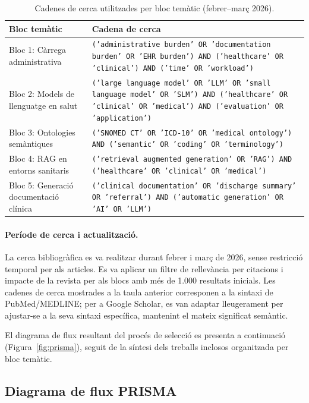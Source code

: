 \documentclass[CAT]{TFUOC}%
\begin{document}
\begin{table}[H]
\centering
\small
\begin{tabular}{p{3.5cm}p{10cm}}
\hline
\textbf{Bloc temàtic} & \textbf{Cadena de cerca} \\
\hline
Bloc 1: Càrrega administrativa & \texttt{('administrative burden' OR 'documentation burden' OR 'EHR burden') AND ('healthcare' OR 'clinical') AND ('time' OR 'workload')} \\
\hline
Bloc 2: Models de llenguatge en salut & \texttt{('large language model' OR 'LLM' OR 'small language model' OR 'SLM') AND ('healthcare' OR 'clinical' OR 'medical') AND ('evaluation' OR 'application')} \\
\hline
Bloc 3: Ontologies semàntiques & \texttt{('SNOMED CT' OR 'ICD-10' OR 'medical ontology') AND ('semantic' OR 'coding' OR 'terminology')} \\
\hline
Bloc 4: RAG en entorns sanitaris & \texttt{('retrieval augmented generation' OR 'RAG') AND ('healthcare' OR 'clinical' OR 'medical')} \\
\hline
Bloc 5: Generació documentació clínica & \texttt{('clinical documentation' OR 'discharge summary' OR 'referral') AND ('automatic generation' OR 'AI' OR 'LLM')} \\
\hline
\end{tabular}
\caption{Cadenes de cerca utilitzades per bloc temàtic (febrer--març 2026).}
\label{tab:search-strings}
\end{table}

\paragraph{Període de cerca i actualització.}
La cerca bibliogràfica es va realitzar durant febrer i març de 2026, sense restricció temporal per als articles. Es va aplicar un filtre de rellevància per citacions i impacte de la revista per als blocs amb més de 1.000 resultats inicials. Les cadenes de cerca mostrades a la taula anterior corresponen a la sintaxi de PubMed/MEDLINE; per a Google Scholar, es van adaptar lleugerament per ajustar-se a la seva sintaxi específica, mantenint el mateix significat semàntic.

El diagrama de flux resultant del procés de selecció es presenta a continuació (Figura~\ref{fig:prisma}), seguit de la síntesi dels treballs inclosos organitzada per bloc temàtic.

\subsection{Diagrama de flux PRISMA}
\end{document}
